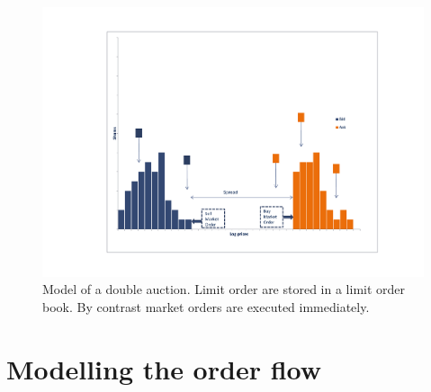 \documentclass[11pt, a4paper]{thesis}  %
\begin{document}
\begin{figure}[h]
	\begin{center}
		\includegraphics[width=1\textwidth]
		{Continuous_Auction_Model.pdf}
		\caption{Model of a double auction. Limit order are stored in a limit order book. 
		By contrast market orders are executed immediately.}
		\label{exercise_boundary_amaerican_option_fd}
	\end{center}		
\end{figure}


\chapter{Modelling the order flow}
\label{chapter:order_flow_model}

\end{document}
